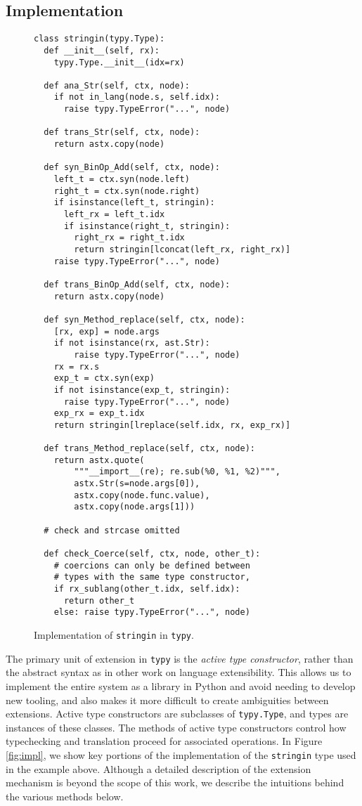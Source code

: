 \documentclass[10pt]{sigplanconf}
\theoremstyle{definition}
\begin{document}
\subsection{Implementation}


\begin{figure}
\begin{lstlisting}
class stringin(typy.Type):
  def __init__(self, rx):
    typy.Type.__init__(idx=rx)

  def ana_Str(self, ctx, node):
    if not in_lang(node.s, self.idx):
      raise typy.TypeError("...", node)

  def trans_Str(self, ctx, node):
    return astx.copy(node)

  def syn_BinOp_Add(self, ctx, node):
    left_t = ctx.syn(node.left)
    right_t = ctx.syn(node.right)
    if isinstance(left_t, stringin):
      left_rx = left_t.idx
      if isinstance(right_t, stringin):
        right_rx = right_t.idx
        return stringin[lconcat(left_rx, right_rx)]
    raise typy.TypeError("...", node)

  def trans_BinOp_Add(self, ctx, node):
    return astx.copy(node)

  def syn_Method_replace(self, ctx, node):
    [rx, exp] = node.args
    if not isinstance(rx, ast.Str):
        raise typy.TypeError("...", node)
    rx = rx.s
    exp_t = ctx.syn(exp)
    if not isinstance(exp_t, stringin):
      raise typy.TypeError("...", node)
    exp_rx = exp_t.idx
    return stringin[lreplace(self.idx, rx, exp_rx)]

  def trans_Method_replace(self, ctx, node):
    return astx.quote(
        """__import__(re); re.sub(%0, %1, %2)""",
        astx.Str(s=node.args[0]),
        astx.copy(node.func.value),
        astx.copy(node.args[1]))

  # check and strcase omitted

  def check_Coerce(self, ctx, node, other_t):
    # coercions can only be defined between 
    # types with the same type constructor, 
    if rx_sublang(other_t.idx, self.idx):
      return other_t
    else: raise typy.TypeError("...", node)
\end{lstlisting}
\caption{Implementation of \texttt{stringin} in {\tt typy}.}
\label{fig:impl}

\label{fig:atimpl}\end{figure}
The primary unit of extension in \verb|typy| is the \emph{active type constructor}, rather than the abstract syntax as in other work on language extensibility. This allows us to implement the entire system as a library in Python and avoid needing to develop new tooling, and also makes it more difficult to create ambiguities between extensions. Active type constructors are subclasses of \verb|typy.Type|, and types are instances of these classes. The methods of active type constructors control how typechecking and translation proceed for associated operations. 
In Figure \ref{fig:impl}, we show key portions of the implementation of the \verb|stringin| type used in the example above. Although a detailed description of the extension mechanism is beyond the scope of this work, we describe the intuitions behind the various methods below.
\end{document}
